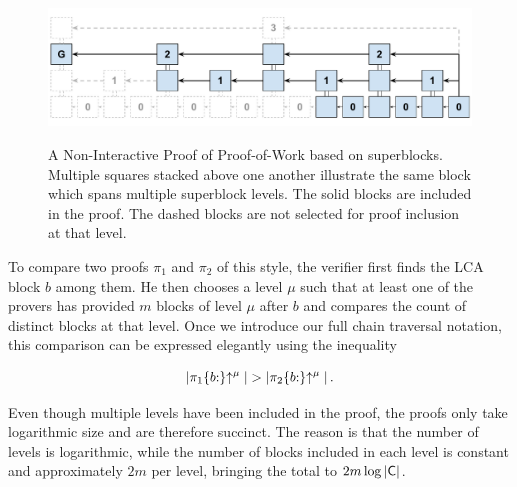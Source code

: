 \begin{figure}
    \caption{
      A Non-Interactive Proof of Proof-of-Work based on superblocks. Multiple
      squares stacked above one another illustrate the same block which spans
      multiple superblock levels. The solid blocks are included in the proof.
      The dashed blocks are not selected for proof inclusion at that level.
    }
    \centering
    \includegraphics[width=\columnwidth,keepaspectratio]{chapters/introduction/figures/non-interactive-popow.pdf}
    \label{fig.nipopow-example}
\end{figure}

To compare two proofs $\pi_1$ and $\pi_2$ of this style, the verifier first
finds the LCA block $b$ among them. He then chooses a level $\mu$ such that at
least one of the provers has provided $m$ blocks of level $\mu$ after $b$ and
compares the count of distinct blocks at that level. Once we introduce our full
chain traversal notation, this comparison can be expressed elegantly using the
inequality

\[
|\pi_1\{b{:}\}\negthickspace\uparrow^\mu| > |\pi_2\{b{:}\}\negthickspace\uparrow^\mu|
\,.
\]

Even though multiple levels have been included in the proof, the proofs only
take logarithmic size and are therefore succinct. The reason is that the number
of levels is logarithmic, while the number of blocks included in each level is
constant and approximately $2m$ per level, bringing the total to
$2m\log|\mathsf{C}|$.



